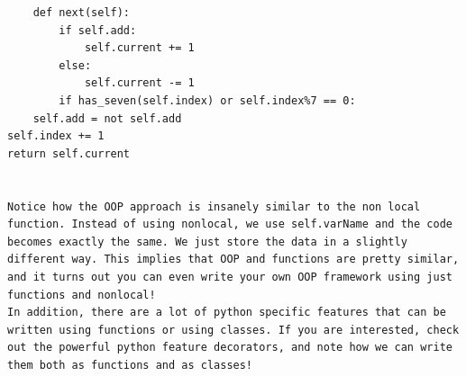 \documentclass{exam}
\begin{document}
\begin{questions}
\begin{blocksection}
\begin{solution}[0.3in]
\begin{lstlisting}
	def next(self):
		if self.add:
			self.current += 1
		else:
			self.current -= 1
		if has_seven(self.index) or self.index%7 == 0:
	self.add = not self.add
self.index += 1
return self.current


Notice how the OOP approach is insanely similar to the non local function. Instead of using nonlocal, we use self.varName and the code becomes exactly the same. We just store the data in a slightly different way. This implies that OOP and functions are pretty similar, and it turns out you can even write your own OOP framework using just functions and nonlocal! 
In addition, there are a lot of python specific features that can be written using functions or using classes. If you are interested, check out the powerful python feature decorators, and note how we can write them both as functions and as classes!
\end{lstlisting}
\end{solution}

\end{blocksection}

\end{questions}

\end{document}
